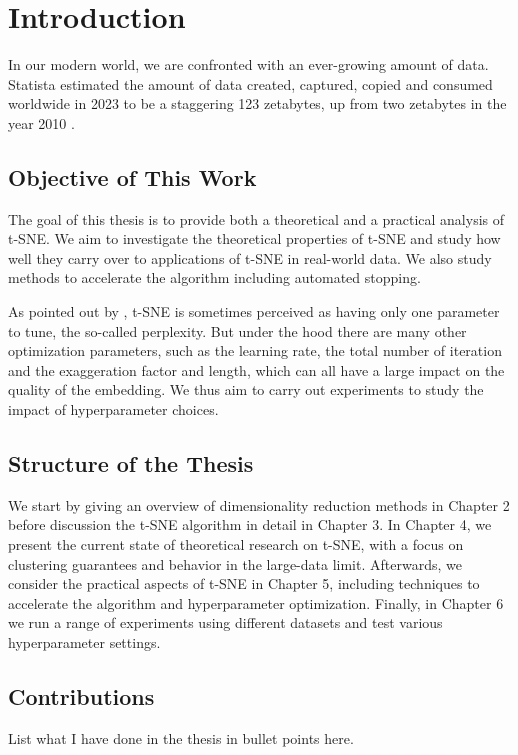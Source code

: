 \chapter{Introduction}

In our modern world, we are confronted with an ever-growing amount of data. Statista estimated the amount of data created, captured, copied and consumed worldwide in 2023 to be a staggering 123 zetabytes, up from two zetabytes in the year 2010 \cite{Statista}.

\section*{Objective of This Work}
The goal of this thesis is to provide both a theoretical and a practical analysis of t-SNE. 
We aim to investigate the theoretical properties of t-SNE and study how well they carry over to applications of t-SNE in real-world data. 
We also study methods to accelerate the algorithm including automated stopping.

As pointed out by \cite{KoBe19SingleCell}, t-SNE is sometimes perceived as having only one parameter to tune, the so-called perplexity. 
But under the hood there are many other optimization parameters, such as the learning rate, the total number of iteration and the exaggeration factor and length, which can all have a large impact on the quality of the embedding. 
We thus aim to carry out experiments to study the impact of hyperparameter choices. 
 

\section*{Structure of the Thesis}
We start by giving an overview of dimensionality reduction methods in Chapter 2 before discussion the t-SNE algorithm in detail in Chapter 3. 
In Chapter 4, we present the current state of theoretical research on t-SNE, with a focus on clustering guarantees and behavior in the large-data limit. 
Afterwards, we consider the practical aspects of t-SNE in Chapter 5, including techniques to accelerate the algorithm and hyperparameter optimization. 
Finally, in Chapter 6 we run a range of experiments using different datasets and test various hyperparameter settings. 

\section*{Contributions}
List what I have done in the thesis in bullet points here. 



